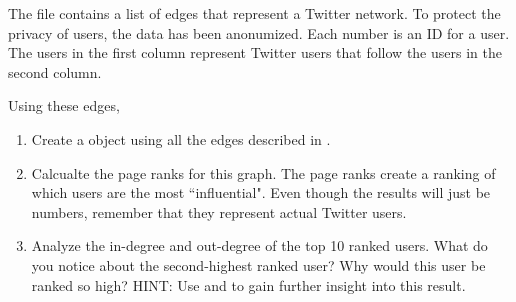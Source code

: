 \begin{problem}
The  file contains a list of edges that represent a Twitter network. To protect the privacy of users, the data has been anonumized. Each number is an ID for a user. The users in the first column represent Twitter users that follow the users in the second column.

Using these edges,
\begin{enumerate}
\item Create a  object using all the edges described in .
\item Calcualte the page ranks for this graph. The page ranks create a ranking of which users are the most ``influential". Even though the results will just be numbers, remember that they represent actual Twitter users.
\item Analyze the in-degree and out-degree of the top 10 ranked users. What do you notice about the second-highest ranked user? Why would this user be ranked so high? HINT: Use  and  to gain further insight into this result.
\end{enumerate}
\end{problem}
